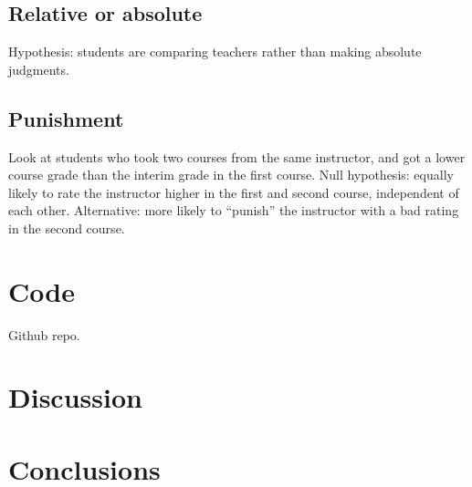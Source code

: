 \documentclass[12pt]{article}
\begin{document}
\subsection{Relative or absolute}
Hypothesis: students are comparing teachers rather than making absolute judgments.


\subsection{Punishment}
Look at students who took two courses from the same instructor, and got a lower course grade than the interim grade in the first course.
Null hypothesis: equally likely to rate the instructor higher in the first and second course, 
independent of each other.
Alternative: more likely to ``punish'' the instructor with a bad rating in the second course.


\section{Code}
Github repo.

\section{Discussion}

\section{Conclusions}
\end{document}

